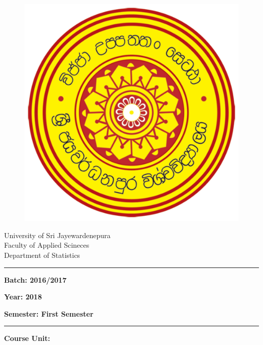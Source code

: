 \documentclass[a4paper,12pt]{article}
\begin{document}
\begin{figure}[ht]
	\begin{center}
		\includegraphics[angle=0,scale=0.05]{SJPLogo.jpg}
	\end{center}
\end{figure}

\vspace{-1cm}

\begin{center}
	University of Sri Jayewardenepura\\
	Faculty of Applied Scineces \\
	Department of Statistics
\end{center}


\noindent\rule{17cm}{0.4pt} 	%

\begin{multicols}{3}
	\noindent\textbf{Batch: 2016/2017}
	
	\columnbreak
	\noindent\textbf{Year: 2018 }
	
	\columnbreak
	\noindent\textbf{Semester: First Semester}
	
\end{multicols}

\noindent\rule{17cm}{0.4pt}	%

\vspace{0.5cm}
\noindent\textbf{Course Unit:}\\
\end{document}
